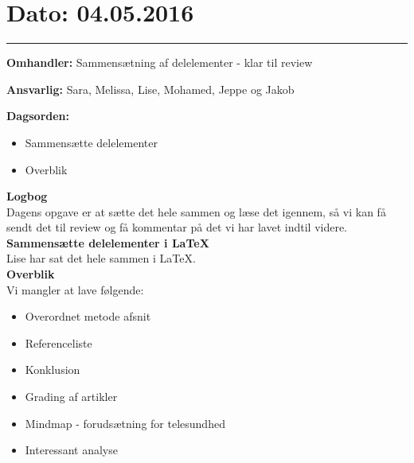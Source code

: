 \section{Dato: 04.05.2016}
\hrule

\textbf{Omhandler:} Sammensætning af delelementer - klar til review

\textbf{Ansvarlig:} Sara, Melissa, Lise, Mohamed, Jeppe og Jakob

\textbf{Dagsorden:}
\begin{itemize}
	\item Sammensætte delelementer
	\item Overblik
\end{itemize}

\textbf{Logbog}
\\
Dagens opgave er at sætte det hele sammen og læse det igennem, så vi kan få sendt det til review og få kommentar på det vi har lavet indtil videre.
\\

\textbf{Sammensætte delelementer i LaTeX}
\\
Lise har sat det hele sammen i LaTeX.
\\

\textbf{Overblik}
\\
Vi mangler at lave følgende:
\begin{itemize}
	\item Overordnet metode afsnit
	\item Referenceliste
	\item Konklusion
	\item Grading af artikler
	\item Mindmap - forudsætning for telesundhed
	\item Interessant analyse
\end{itemize}
\\

